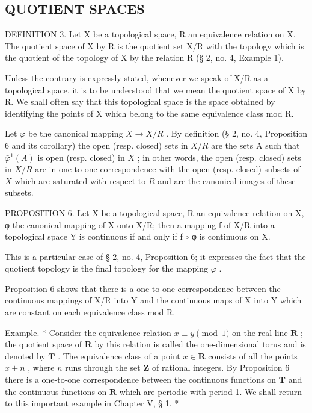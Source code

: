 \subsection{QUOTIENT SPACES}

DEFINITION 3. Let X be a topological space, R an equivalence relation on X. The quotient space of X by R is the quotient set X/R with the topology which is the quotient of the topology of X by the relation R (§ 2, no. 4, Example 1).

Unless the contrary is expressly stated, whenever we speak of X/R as a topological space, it is to be understood that we mean the quotient space of X by R. We shall often say that this topological space is the space obtained by identifying the points of X which belong to the same equivalence class mod R.

Let \(\varphi\) be the canonical mapping \(X \to X/R\) . By definition (§ 2, no. 4, Proposition 6 and its corollary) the open (resp. closed) sets in \(X/R\) are the sets A such that \(\bar{\varphi}^{1}(A)\) is open (resp. closed) in \(X\) ; in other words, the open (resp. closed) sets in \(X/R\) are in one-to-one correspondence with the open (resp. closed) subsets of \(X\) which are saturated with respect to \(R\) and are the canonical images of these subsets.

PROPOSITION 6. Let X be a topological space, R an equivalence relation on X, φ the canonical mapping of X onto X/R; then a mapping f of X/R into a topological space Y is continuous if and only if f \(\circ\) φ is continuous on X.

This is a particular case of § 2, no. 4, Proposition 6; it expresses the fact that the quotient topology is the final topology for the mapping \(\varphi\) .

Proposition 6 shows that there is a one-to-one correspondence between the continuous mappings of X/R into Y and the continuous maps of X into Y which are constant on each equivalence class mod R.

Example. * Consider the equivalence relation \(x \equiv y \pmod{1}\) on the real line \(\mathbf{R}\) ; the quotient space of \(\mathbf{R}\) by this relation is called the one-dimensional torus and is denoted by \(\mathbf{T}\) . The equivalence class of a point \(x \in \mathbf{R}\) consists of all the points \(x + n\) , where \(n\) runs through the set \(\mathbf{Z}\) of rational integers. By Proposition 6 there is a one-to-one correspondence between the continuous functions on \(\mathbf{T}\) and the continuous functions on \(\mathbf{R}\) which are periodic with period 1. We shall return to this important example in Chapter V, § 1. *

